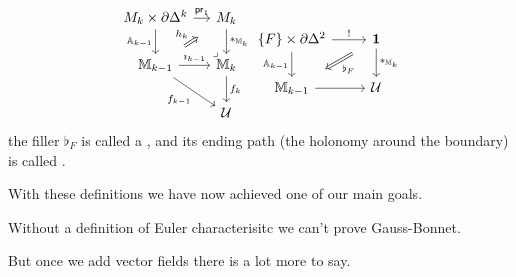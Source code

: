 \begin{frame}
\begin{mydef}[cont.]
\[\begin{tikzcd}[ampersand replacement=\&, column sep=small]
  {M_k\times \partial\Delta^k} \& {M_k} \\
  {\mathbb{M}_{k-1}} \& {\mathbb{M}_k} \\
  \& {\mathcal{U}}
  \arrow["{\mathrm{pr}_1}", from=1-1, to=1-2]
  \arrow["{\mathbb{A}_{k-1}}"', from=1-1, to=2-1]
  \arrow["{*_{\mathbb{M}_k}}", from=1-2, to=2-2]
  \arrow["{h_k}", shorten <=10pt, shorten >=10pt, Rightarrow, from=2-1, to=1-2]
  \arrow["{\imath_{k-1}}", from=2-1, to=2-2]
  \arrow[""{name=0, anchor=center, inner sep=0}, "{f_{k-1}}"', from=2-1, to=3-2]
  \arrow["\ulcorner"{pos=-0.05, rotate=180}, shift left=1.5, draw=none, from=2-2, to=1-1]
  \arrow["{f_k}", from=2-2, to=3-2]
\end{tikzcd}
\begin{tikzcd}[ampersand replacement=\&]
  {\{F\}\times \partial\Delta^2} \& \unit \\
  {\mathbb{M}_{k-1}} \& {\mathcal{U}}
  \arrow["{!}", from=1-1, to=1-2]
  \arrow["{\mathbb{A}_{k-1}}"', from=1-1, to=2-1]
  \arrow["{*_{\mathbb{M}_k}}", from=1-2, to=2-2]
  \arrow["{\flat_F}", shorten <=11pt, shorten >=11pt, Rightarrow, from=1-2, to=2-1]
  \arrow[from=2-1, to=2-2]
\end{tikzcd}\]
the filler \( \flat_F \) is called a , and its ending path (the holonomy around the boundary) is called .
\end{mydef}
\end{frame}
\begin{frame}
With these definitions we have now achieved one of our main goals.

Without a definition of Euler characterisitc we can't prove Gauss-Bonnet.

But once we add vector fields there is a lot more to say.
\end{frame}

